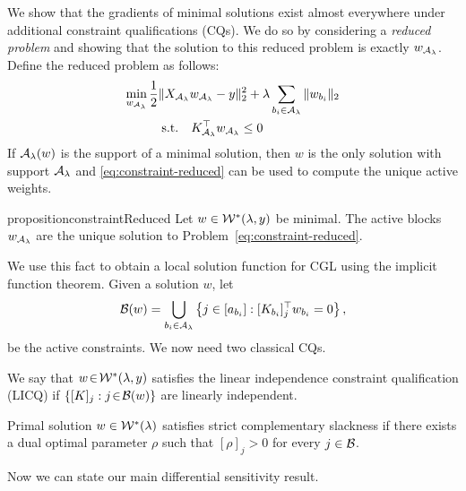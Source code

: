 We show that the gradients of minimal solutions exist
almost everywhere under additional constraint qualifications (CQs).
We do so by considering a \emph{reduced problem} and showing that the
solution to this reduced problem is exactly \( w_{\mathcal{A}_{\lambda}} \).
Define the reduced problem as follows:
\begin{equation}\label{eq:constraint-reduced}
    \begin{aligned}
        \min_{w_{\mathcal{A}_{\lambda}}} \,
         & \frac 1 2 \|X_{\mathcal{A}_{\lambda}} w_{\mathcal{A}_{\lambda}} - y\|_2^2 + \lambda \sum_{{b_i} \in {\mathcal{A}_{\lambda}}} \|w_{b_i}\|_2 \\
         & \quad \text{s.t.} \quad K_{\mathcal{A}_{\lambda}}^\top w_{\mathcal{A}_{\lambda}} \leq 0
    \end{aligned}
\end{equation}
If \( {\mathcal{A}_{\lambda}}(w) \) is the support of a minimal solution, then \( w \) is the only
solution with support \( {\mathcal{A}_{\lambda}} \) and \cref{eq:constraint-reduced} can be used
to compute the unique active weights.
\begin{restatable}{proposition}{constraintReduced}\label{prop:constraint-reduced}
    Let \( w \in \mathcal{W}^*(\lambda, y) \) be minimal.
    The active blocks \( w_{\mathcal{A}_{\lambda}} \) are the unique solution to
    Problem~\eqref{eq:constraint-reduced}.
\end{restatable}
We use this fact to obtain a local solution function
for CGL using the implicit function theorem.
Given a solution \( w \), let
\[
    \mathcal{B}(w) = \bigcup_{{b_i} \in {\mathcal{A}_{\lambda}}} \left\{j \in [a_{b_i}]: [K_{{b_i}}]_j^\top w_{b_i} = 0 \right\},
\]
be the active constraints.
We now need two classical CQs.

\begin{definition}[LICQ]
    We say that \( w \! \in \! \mathcal{W}^*(\lambda, y) \) satisfies the linear
    independence constraint qualification (LICQ) if
    \( \left\{[K]_j : j \! \in \! \mathcal{B}(w)\right\} \) are linearly independent.
\end{definition}

\begin{definition}[SCS]
    Primal solution \( w \in \mathcal{W}^*(\lambda) \) satisfies
    strict complementary slackness if there exists a dual optimal parameter
    \( \rho \) such that \( [\rho]_j > 0 \) for every \( j \in \mathcal{B} \).
\end{definition}

Now we can state our main differential sensitivity result.

